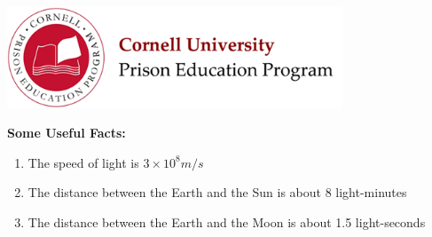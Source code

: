 \documentclass[12pt]{exam}
\begin{document}

\begin{flushright}
\vspace{0.2in}

\end{flushright}

\begin{center}
\includegraphics[width=10cm]{../images/logo.png}
\end{center}

\begin{center}
\end{center}

\noindent\textbf{\Large Some Useful Facts:}
\begin{enumerate}
\item The speed of light is $3\times 10^8 m/s$
\item The distance between the Earth and the Sun is about 8 light-minutes
\item The distance between the Earth and the Moon is about 1.5 light-seconds
\end{enumerate}

\clearpage
\end{document}
